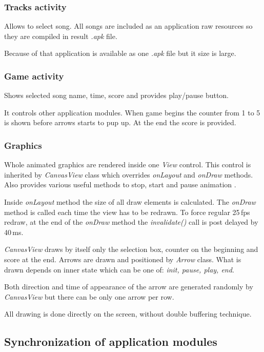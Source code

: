 \documentclass[conference]{IEEEtran}
\begin{document}
\subsubsection{Tracks activity}
Allows to select song. All songs are included as an application raw resources so they are compiled in result \emph{.apk} file.

Because of that application is available as one \emph{.apk} file but it size is large.


\subsubsection{Game activity}
Shows selected song name, time, score and provides play/pause button.

It controls other application modules.
When game begins the counter from 1 to 5 is shown before arrows starts to pup up. At the end the score is provided.

\subsubsection{Graphics}
Whole animated graphics are rendered inside one \emph{View} control.
This control is inherited by \emph{CanvasView} class which overrides \emph{onLayout} and \emph{onDraw} methods. Also provides various useful methods to stop, start and pause animation \cite{Application}.

Inside \emph{onLayout} method the size of all draw elements is calculated.
The \emph{onDraw} method is called each time the view has to be redrawn.
To force regular 25\,fps redraw, at the end of the \emph{onDraw} method the \emph{invalidate()} call is post delayed by 40\,ms.


\emph{CanvasView} draws by itself only the selection box, counter on the beginning and score at the end.
Arrows are drawn and positioned by \emph{Arrow} class.
What is drawn depends on inner state which can be one of: \emph{init, pause, play, end}.

Both direction and time of appearance of the arrow are generated randomly by \emph{CanvasView} but there can be only one arrow per row.

All drawing is done directly on the screen, without double buffering technique.

\subsection{Synchronization of application modules}
\end{document}
